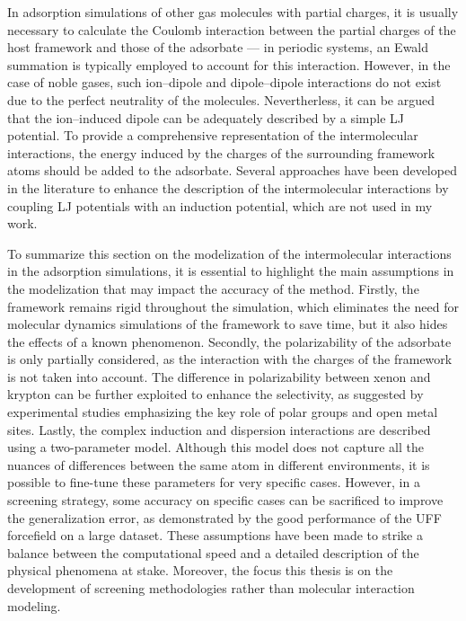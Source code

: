 \documentclass[main.tex]{subfiles}
\begin{document}
In adsorption simulations of other gas molecules with partial charges, it is usually necessary to calculate the Coulomb interaction between the partial charges of the host framework and those of the adsorbate --- in periodic systems, an Ewald summation is typically employed to account for this interaction. However, in the case of noble gases, such ion--dipole and dipole--dipole interactions do not exist due to the perfect neutrality of the molecules. Nevertherless, it can be argued that the ion--induced dipole can be adequately described by a simple LJ potential. To provide a comprehensive representation of the intermolecular interactions, the energy induced by the charges of the surrounding framework atoms should be added to the adsorbate. Several approaches have been developed in the literature to enhance the description of the intermolecular interactions by coupling LJ potentials with an induction potential,\autocite{Lachet_1998,Becker_2017} which are not used in my work.

To summarize this section on the modelization of the intermolecular interactions in the adsorption simulations, it is essential to highlight the main assumptions in the modelization that may impact the accuracy of the method. Firstly, the framework remains rigid throughout the simulation, which eliminates the need for molecular dynamics simulations of the framework to save time, but it also hides the effects of a known phenomenon.\autocite{Witman_2017} Secondly, the polarizability of the adsorbate is only partially considered, as the interaction with the charges of the framework is not taken into account. The difference in polarizability between xenon and krypton can be further exploited to enhance the selectivity, as suggested by experimental studies emphasizing the key role of polar groups and open metal sites.\autocite{Li_2019,Pei_2022,Perry_2014} Lastly, the complex induction and dispersion interactions are described using a two-parameter model. Although this model does not capture all the nuances of differences between the same atom in different environments, it is possible to fine-tune these parameters for very specific cases. However, in a screening strategy, some accuracy on specific cases can be sacrificed to improve the generalization error, as demonstrated by the good performance of the UFF forcefield on a large dataset.\autocite{McDaniel_2015}
These assumptions have been made to strike a balance between the computational speed and a detailed description of the physical phenomena at stake. Moreover, the focus this thesis is on the development of screening methodologies rather than molecular interaction modeling.
\end{document}
